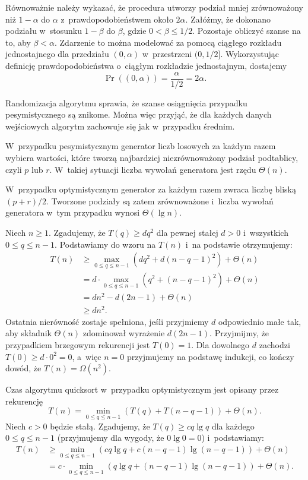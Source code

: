 \exercise %
Równoważnie należy wykazać, że procedura  utworzy podział mniej zrównoważony niż $1-\alpha$ do $\alpha$ z~prawdopodobieństwem około $2\alpha$. Załóżmy, że dokonano podziału w~stosunku $1-\beta$ do $\beta$, gdzie $0<\beta\le1/2$. Pozostaje obliczyć szanse na to, aby $\beta<\alpha$. Zdarzenie to można modelować za pomocą ciągłego rozkładu jednostajnego dla przedziału $(0,\alpha)$ w~przestrzeni $(0,1/2]$. Wykorzystując definicję prawdopodobieństwa o~ciągłym rozkładzie jednostajnym, dostajemy
\[
	\Pr((0,\alpha)) = \frac{\alpha}{1/2} = 2\alpha.
\]


\exercise %
Randomizacja algorytmu sprawia, że szanse osiągnięcia przypadku pesymistycznego są znikome. Można więc przyjąć, że dla każdych danych wejściowych algorytm zachowuje się jak w~przypadku średnim.

\exercise %
W~przypadku pesymistycznym generator liczb losowych za każdym razem wybiera wartości, które tworzą najbardziej niezrównoważony podział podtablicy, czyli $p$ lub $r$. W~takiej sytuacji liczba wywołań generatora jest rzędu $\Theta(n)$.

W~przypadku optymistycznym generator za każdym razem zwraca liczbę bliską $(p+r)/2$. Tworzone podziały są zatem zrównoważone i~liczba wywołań generatora w~tym przypadku wynosi $\Theta(\lg n)$.


\exercise %
Niech $n\ge1$. Zgadujemy, że $T(q)\ge dq^2$ dla pewnej stałej $d>0$ i~wszystkich $0\le q\le n-1$. Podstawiamy do wzoru na $T(n)$ i~na podstawie  otrzymujemy:
\begin{align*}
	T(n) &\ge \max_{0\le q\le n-1}(dq^2+d(n-q-1)^2)+\Theta(n) \\
	&= d\cdot\!\!\!\max_{0\le q\le n-1}(q^2+(n-q-1)^2)+\Theta(n) \\
	&= dn^2-d(2n-1)+\Theta(n) \\
	&\ge dn^2.
\end{align*}
Ostatnia nierówność zostaje spełniona, jeśli przyjmiemy $d$ odpowiednio małe tak, aby składnik $\Theta(n)$ zdominował wyrażenie $d(2n-1)$. Przyjmijmy, że przypadkiem brzegowym rekurencji jest $T(0)=1$. Dla dowolnego $d$ zachodzi $T(0)\ge d\cdot0^2=0$, a~więc $n=0$ przyjmujemy na podstawę indukcji, co kończy dowód, że $T(n)=\Omega(n^2)$.

\exercise %
Czas algorytmu quicksort w~przypadku optymistycznym jest opisany przez rekurencję
\[
    T(n) = \min_{0\le q\le n-1}(T(q)+T(n-q-1))+\Theta(n).
\]
Niech $c>0$ będzie stałą. Zgadujemy, że $T(q)\ge cq\lg q$ dla każdego $0\le q\le n-1$ (przyjmujemy dla wygody, że $0\lg0=0$) i~podstawiamy:
\begin{align*}
    T(n) &\ge \min_{0\le q\le n-1}(cq\lg q+c(n-q-1)\lg(n-q-1))+\Theta(n) \\
	&= c\cdot\!\!\!\min_{0\le q\le n-1}(q\lg q+(n-q-1)\lg(n-q-1))+\Theta(n).
\end{align*}

